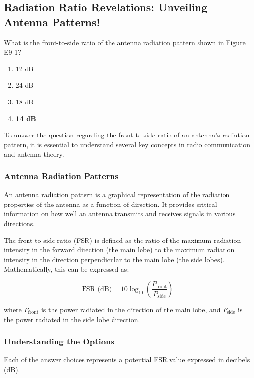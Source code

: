 \subsection{Radiation Ratio Revelations: Unveiling Antenna Patterns!}

\begin{tcolorbox}[colback=gray!10, colframe=black, title=E9B03] What is the front-to-side ratio of the antenna radiation pattern shown in Figure E9-1?

\begin{enumerate}[label=\Alph*]
    \item 12 dB
    \item 24 dB
    \item 18 dB
    \item \textbf{14 dB}
\end{enumerate} \end{tcolorbox}

To answer the question regarding the front-to-side ratio of an antenna's radiation pattern, it is essential to understand several key concepts in radio communication and antenna theory.

\subsubsection{Antenna Radiation Patterns}
An antenna radiation pattern is a graphical representation of the radiation properties of the antenna as a function of direction. It provides critical information on how well an antenna transmits and receives signals in various directions. 

The front-to-side ratio (FSR) is defined as the ratio of the maximum radiation intensity in the forward direction (the main lobe) to the maximum radiation intensity in the direction perpendicular to the main lobe (the side lobes). Mathematically, this can be expressed as:

\[
\text{FSR (dB)} = 10 \log_{10} \left( \frac{P_{\text{front}}}{P_{\text{side}}} \right)
\]

where \( P_{\text{front}} \) is the power radiated in the direction of the main lobe, and \( P_{\text{side}} \) is the power radiated in the side lobe direction.

\subsubsection{Understanding the Options}
Each of the answer choices represents a potential FSR value expressed in decibels (dB). 

